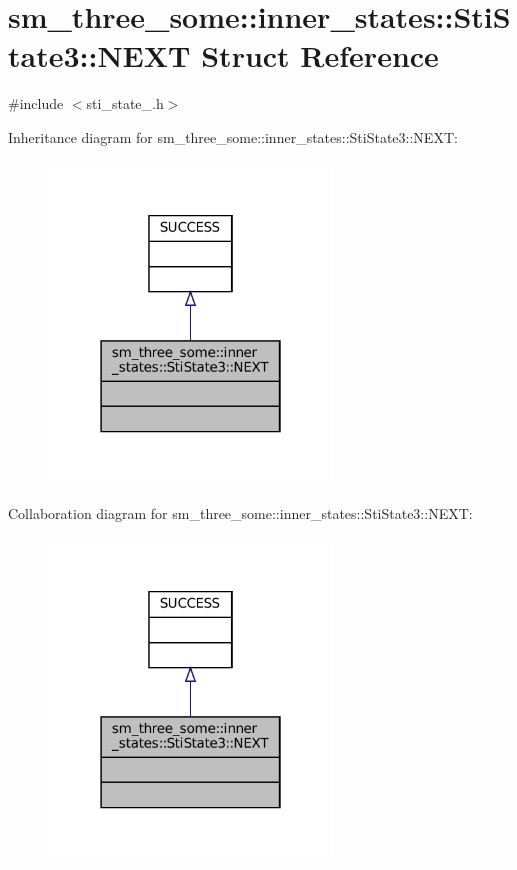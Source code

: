 \hypertarget{structsm__three__some_1_1inner__states_1_1StiState3_1_1NEXT}{}\section{sm\+\_\+three\+\_\+some\+:\+:inner\+\_\+states\+:\+:Sti\+State3\+:\+:N\+E\+XT Struct Reference}
\label{structsm__three__some_1_1inner__states_1_1StiState3_1_1NEXT}


{\ttfamily \#include $<$sti\+\_\+state\+\_.\+h$>$}



Inheritance diagram for sm\+\_\+three\+\_\+some\+:\+:inner\+\_\+states\+:\+:Sti\+State3\+:\+:N\+E\+XT\+:
\nopagebreak
\begin{figure}[H]
\begin{center}
\leavevmode
\includegraphics[width=214pt]{structsm__three__some_1_1inner__states_1_1StiState3_1_1NEXT__inherit__graph}
\end{center}
\end{figure}


Collaboration diagram for sm\+\_\+three\+\_\+some\+:\+:inner\+\_\+states\+:\+:Sti\+State3\+:\+:N\+E\+XT\+:
\nopagebreak
\begin{figure}[H]
\begin{center}
\leavevmode
\includegraphics[width=214pt]{structsm__three__some_1_1inner__states_1_1StiState3_1_1NEXT__coll__graph}
\end{center}
\end{figure}


